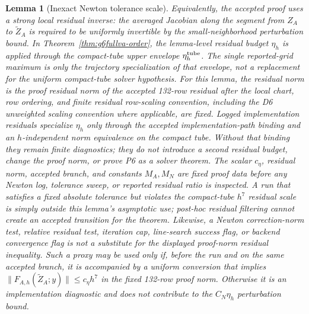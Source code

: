 \documentclass[preprint,12pt]{elsarticle}
\newtheorem{lemma}{Lemma}
\begin{document}
\begin{lemma}[Inexact Newton tolerance scale]
Equivalently, the accepted proof uses a strong local residual inverse: the
averaged Jacobian along the segment from $Z_A$ to $\widetilde Z_A$ is required
to be uniformly invertible by the small-neighborhood perturbation bound.
In Theorem~\ref{thm:g6fullva-order}, the lemma-level residual budget
\(\eta_h\) is applied through the compact-tube upper envelope
\(\eta_h^{\rm tube}\). The single reported-grid maximum is only the
trajectory specialization of that envelope, not a replacement for the
uniform compact-tube solver hypothesis.
For this lemma, the residual norm is the proof residual norm of the accepted
132-row residual after the local chart, row ordering, and finite residual
row-scaling convention, including the D6 unweighted scaling convention where
applicable, are fixed. Logged implementation residuals specialize
\(\eta_h\) only through the accepted implementation-path binding and an
\(h\)-independent norm equivalence on the compact tube. Without that binding
they remain finite diagnostics; they do not introduce a second residual
budget, change the proof norm, or prove P6 as a solver theorem.
The scalar \(c_\eta\), residual norm, accepted branch, and constants
\(M_A,M_N\) are fixed proof data before any Newton log, tolerance sweep, or
reported residual ratio is inspected. A run that satisfies a fixed absolute
tolerance but violates the compact-tube \(h^7\) residual scale is simply
outside this lemma's asymptotic use; post-hoc residual filtering cannot create
an accepted transition for the theorem.
Likewise, a Newton correction-norm test, relative residual test, iteration
cap, line-search success flag, or backend convergence flag is not a substitute
for the displayed proof-norm residual inequality. Such a proxy may be used
only if, before the run and on the same accepted branch, it is accompanied by
a uniform conversion that implies
\(\|F_{A,h}(\widetilde Z_A;y)\|\le c_\eta h^7\) in the fixed 132-row proof
norm. Otherwise it is an implementation diagnostic and does not contribute to
the \(C_N\eta_h\) perturbation bound.
\end{lemma}
\end{document}
